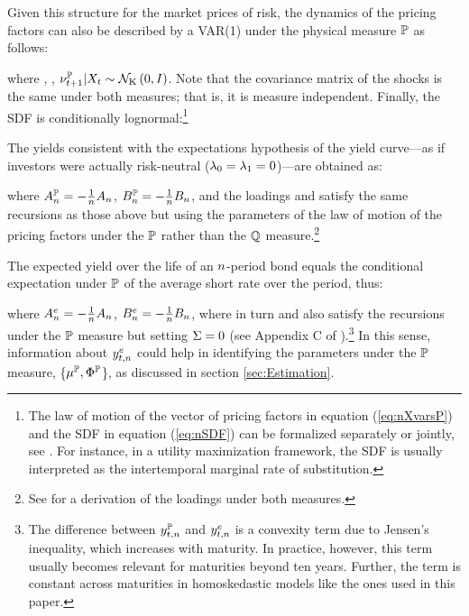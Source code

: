{Given this structure for the market prices of risk, the dynamics of the pricing factors can also be described by a VAR(1) under the physical measure \(\mathbb{P}\) as follows:
	
\noindent where , ,  \(\nu_{t+1}^{\mathbb{P}} | X_{t} \sim \mathcal{N}_{\mathrm{K}} \left(0,I\right)\). Note that the covariance matrix of the shocks is the same under both measures; that is, it is measure independent. 
Finally, the SDF is conditionally lognormal:\footnote{ The law of motion of the vector of pricing factors in equation (\ref{eq:nXvarsP}) and the SDF in equation (\ref{eq:nSDF}) can be formalized separately or jointly, see \cite{GurkaynakWright:2012}. For instance, in a utility maximization framework, the SDF is usually interpreted as the intertemporal marginal rate of substitution.}
	
The yields consistent with the expectations hypothesis of the yield curve---as if investors were actually risk-neutral (\(\lambda_{0} = \lambda_{1} = 0\))---are obtained as:
	
\noindent where \(A_{n}^{\mathbb{P}} = - \frac{1}{n} A_{n}\), \(B_{n}^{\mathbb{P}} = - \frac{1}{n} B_{n}\), and the loadings  and  satisfy the same recursions as those above but using the parameters of the law of motion of the pricing factors under the \(\mathbb{P}\) rather than the \(\mathbb{Q}\) measure.\footnote{ See \cite{Lloyd:2018b} for a derivation of the loadings under both measures.}

The expected yield over the life of an \(n\)-period bond equals the conditional expectation under \(\mathbb{P}\) of the average short rate over the period, thus:
	
\noindent where \(A_{n}^{e} = - \frac{1}{n} A_{n}\), \(B_{n}^{e} = - \frac{1}{n} B_{n}\), where in turn  and  also satisfy the recursions under the \(\mathbb{P}\) measure but setting \(\Sigma = 0\) (see Appendix C of \cite{Guimaraes:2014}).\footnote{ The difference between \(y_{t,n}^{\mathbb{P}}\) and \(y_{t,n}^{e}\) is a convexity term due to Jensen's inequality, which increases with maturity. In practice, however, this term usually becomes relevant for maturities beyond ten years. Further, the term is constant across maturities in homoskedastic models like the ones used in this paper.}
In this sense, information about \(y_{t,n}^{e}\) could help in identifying the parameters under the \(\mathbb{P}\) measure, \{\(\mu^{\mathbb{P}}, \Phi^{\mathbb{P}}\)\}, as discussed in section \ref{sec:Estimation}.

}
